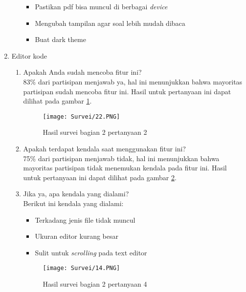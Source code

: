 \begin{enumerate}
\begin{enumerate}
        \begin{itemize}
            \item Pastikan pdf bisa muncul di berbagai \textit{device}
            \item Mengubah tampilan agar soal lebih mudah dibaca
            \item Buat dark theme
        \end{itemize}
    \end{enumerate}
    \item Editor kode
    \begin{enumerate}
        \begin{figure}[H]
        	\centering  
        	\texttt{[image: Survei/21.PNG]}  
        	\caption{Hasil survei bagian 2 pertanyaan 1}
        	\label{fig:5:survei21} 
        \end{figure}
        \item Apakah Anda sudah mencoba fitur ini? \\ 83\% dari partisipan menjawab ya, hal ini menunjukkan bahwa mayoritas partisipan sudah mencoba fitur ini. Hasil untuk pertanyaan ini dapat dilihat pada gambar \ref{fig:5:survei21}.
            \begin{figure}[H]
        	\centering  
        	\texttt{[image: Survei/22.PNG]}  
        	\caption{Hasil survei bagian 2 pertanyaan 2}
        	\label{fig:5:survei22} 
        \end{figure}
        \item Apakah terdapat kendala saat menggunakan fitur ini? \\ 75\% dari partisipan menjawab tidak, hal ini menunjukkan bahwa mayoritas partisipan tidak menemukan kendala pada fitur ini. Hasil untuk pertanyaan ini dapat dilihat pada gambar \ref{fig:5:survei22}.
        \item Jika ya, apa kendala yang dialami? \\ Berikut ini kendala yang dialami:
        \begin{itemize}
            \item Terkadang jenis file tidak muncul
            \item Ukuran editor kurang besar
            \item Sulit untuk \textit{scrolling} pada text editor
        \end{itemize}
            \begin{figure}[H]
        	\centering  
        	\texttt{[image: Survei/14.PNG]}  
        	\caption{Hasil survei bagian 2 pertanyaan 4}

\end{figure}
\end{enumerate}
\end{enumerate}

